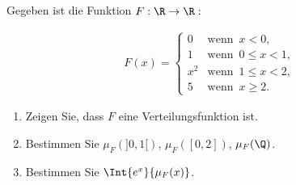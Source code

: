 
\begin{exercise}

Gegeben ist die Funktion $F: \R \to \R:$

\begin{align*}
  F(x) =
  \begin{cases}
    0   & \text{wenn} \enspace x < 0, \\
    1   & \text{wenn} \enspace 0 \leq x < 1, \\
    x^2 & \text{wenn} \enspace 1 \leq x < 2, \\
    5   & \text{wenn} \enspace x \geq 2.
  \end{cases}
\end{align*}

\begin{enumerate}[label = (\alph*)]

  \item
  Zeigen Sie, dass $F$ eine Verteilungsfunktion ist.
  
  \item
  Bestimmen Sie $\mu_F(]0, 1[)$, $\mu_F([0, 2])$, $\mu_F(\Q)$.
  
  \item
  Bestimmen Sie $\Int{e^x}{\mu_F(x)}$.

\end{enumerate}

\end{exercise}


